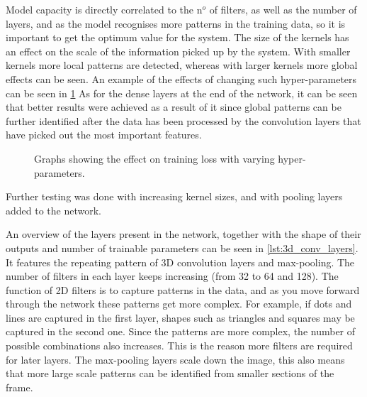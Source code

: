 Model capacity is directly correlated to the n$ ^o $ of filters, as well as the number of layers, and as the model recognises more patterns in the training data, so it is important to get the optimum value for the system. The size of the kernels has an effect on the scale of the information picked up by the system. With smaller kernels more local patterns are detected, whereas with larger kernels more global effects can be seen. An example of the effects of changing such hyper-parameters can be seen in \cref{fig:hyperparameter_tests} As for the dense layers at the end of the network, it can be seen that better results were achieved as a result of it since global patterns can be further identified after the data has been processed by the convolution layers that have picked out the most important features.

\begin{figure}[htb]%
    \centering
    \caption{Graphs showing the effect on training loss with varying hyper-parameters.}%
    \label{fig:hyperparameter_tests}%
\end{figure}

Further testing was done with increasing kernel sizes, and with pooling layers added to the network. 

An overview of the layers present in the network, together with the shape of their outputs and number of trainable parameters can be seen in \cref{lst:3d_conv_layers}. It features the repeating pattern of 3D convolution layers and max-pooling. The number of filters in each layer keeps increasing (from 32 to 64 and 128). The function of 2D filters is to capture patterns in the data, and as you move forward through the network these patterns get more complex. For example, if dots and lines are captured in the first layer, shapes such as triangles and squares may be captured in the second one. Since the patterns are more complex, the number of possible combinations also increases. This is the reason more filters are required for later layers. The max-pooling layers scale down the image, this also means that more large scale patterns can be identified from smaller sections of the frame.

